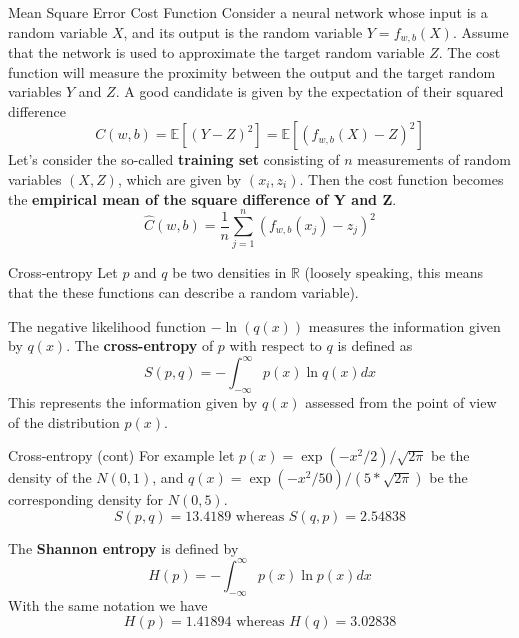 \documentclass{beamer}
\begin{document}
\begin{frame}{Mean Square Error Cost Function}
	Consider a neural network whose input is a random variable $X$, and its output is the random variable $Y=f_{w,b}(X)$. Assume that the network is used to approximate the target random variable $Z$. The cost function will measure the proximity between the output and the target random variables $Y$ and $Z$.  A good candidate is given by the expectation of their squared difference
	\begin{equation*}
		C(w,b)= \mathbb{E}[(Y-Z)^2]= \mathbb{E}[(f_{w,b}(X)-Z)^2]
	\end{equation*}
	Let's consider the so-called \textbf{training set} consisting of $n$ measurements of random variables $(X,Z)$, which are given by $(x_i,z_i)$. Then the cost function becomes the \textbf{empirical mean of the square difference of Y and Z}. 
	\begin{equation*}
		\hat{C}(w,b)=\frac{1}{n} \sum_{j=1}^n (f_{w,b}(x_j)- z_j)^2
	\end{equation*} 
\end{frame}

\begin{frame}{Cross-entropy}
	Let $p$ and $q$ be two densities in $\mathbb{R}$ (loosely speaking, this means that the these functions can describe a random variable).
	
	The negative likelihood function $-\ln(q(x))$ measures the information given by $q(x)$. 
	The \textbf{cross-entropy} of $p$ with respect to $q$ is defined as
	\begin{equation*}
		S(p,q)= - \int_{-\infty}^{\infty} p(x) \ln q(x) dx
	\end{equation*}
	This represents the information given by $q(x)$ assessed from the point of view of the distribution $p(x)$.\\
	
\end{frame}

\begin{frame}{Cross-entropy (cont)}
For example let $p(x)= \exp(-x^2/2)/\sqrt{2\pi}$ be the density of the $N(0,1)$, and $q(x)=\exp(-x^2/50)/(5*\sqrt{2\pi})$ be the corresponding density for $N(0,5)$. 
\begin{equation*}
	S(p,q)= 13.4189 \textrm{ whereas } S(q,p)=2.54838
\end{equation*}

	The \textbf{Shannon entropy} is defined by 
	\begin{equation*}
		H(p)= - \int_{-\infty}^{\infty} p(x) \ln p(x) dx
	\end{equation*}
	With the same notation we have 
		\begin{equation*}
		H(p)= 1.41894 \textrm{ whereas } H(q)=3.02838
	\end{equation*}
	
\end{frame}
\end{document}
